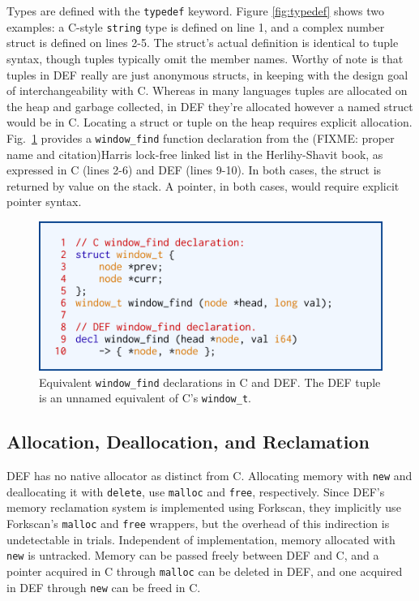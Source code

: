 Types are defined with the \texttt{typedef} keyword.  Figure \ref{fig:typedef} shows two examples: a C-style \texttt{string} type is defined on line 1, and a complex number struct is defined on lines 2-5.  The struct's actual definition is identical to tuple syntax, though tuples typically omit the member names.  Worthy of note is that tuples in DEF really are just anonymous structs, in keeping with the design goal of interchangeability with C.  Whereas in many languages tuples are allocated on the heap and garbage collected, in DEF they're allocated however a named struct would be in C.  Locating a struct or tuple on the heap requires explicit allocation.  Fig.~\ref{fig:window-find} provides a \texttt{window\_{}find} function declaration from the (FIXME: proper name and citation)Harris lock-free linked list in the Herlihy-Shavit book, as expressed in C (lines 2-6) and DEF (lines 9-10).  In both cases, the struct is returned by value on the stack.  A pointer, in both cases, would require explicit pointer syntax.

\begin{figure}[htbp!]
        \centering
        \includegraphics[scale=0.25]{gfx/window-find}
        \caption{Equivalent \texttt{window\_{}find} declarations in C and DEF.  The DEF tuple is an unnamed equivalent of C's \texttt{window\_{}t}.}
        \label{fig:window-find}
\end{figure}

\subsection{Allocation, Deallocation, and Reclamation}

DEF has no native allocator as distinct from C.  Allocating memory with \texttt{new} and deallocating it with \texttt{delete}, use \texttt{malloc} and \texttt{free}, respectively.  Since DEF's memory reclamation system is implemented using Forkscan, they implicitly use Forkscan's \texttt{malloc} and \texttt{free} wrappers, but the overhead of this indirection is undetectable in trials.  Independent of implementation, memory allocated with \texttt{new} is untracked.  Memory can be passed freely between DEF and C, and a pointer acquired in C through \texttt{malloc} can be deleted in DEF, and one acquired in DEF through \texttt{new} can be freed in C.

